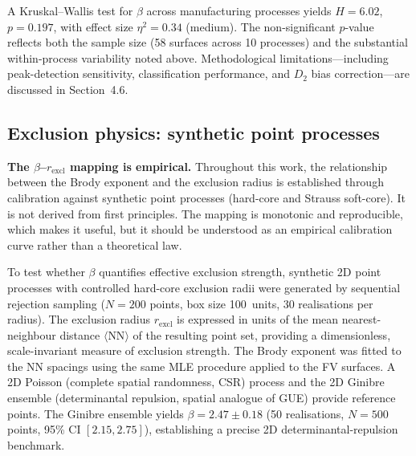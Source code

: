 \documentclass[final,3p,times,twocolumn]{elsarticle}
\theoremstyle{definition}
\begin{document}
A Kruskal--Wallis test for $\beta$ across manufacturing
processes yields $H = 6.02$, $p = 0.197$, with effect size
$\eta^2 = 0.34$ (medium). The non-significant $p$-value reflects
both the sample size (58 surfaces across 10 processes) and the
substantial within-process variability noted above.
Methodological limitations---including peak-detection sensitivity,
classification performance, and $D_2$ bias correction---are
discussed in Section~4.6.

\subsection{Exclusion physics: synthetic point processes}

\textbf{The $\beta$--$r_{\text{excl}}$ mapping is empirical.}
Throughout this work, the relationship between the Brody exponent
and the exclusion radius is established through calibration against
synthetic point processes (hard-core and Strauss soft-core). It is
not derived from first principles. The mapping is monotonic and
reproducible, which makes it useful, but it should be understood
as an empirical calibration curve rather than a theoretical law.

To test whether $\beta$ quantifies effective exclusion strength,
synthetic 2D point
processes with controlled hard-core exclusion radii were
generated by sequential rejection sampling ($N=200$ points,
box size 100~units, 30 realisations per radius). The exclusion
radius $r_{\text{excl}}$ is expressed in units of the mean
nearest-neighbour distance $\langle\text{NN}\rangle$ of the
resulting point set, providing a dimensionless, scale-invariant
measure of exclusion strength. The Brody exponent was fitted to
the NN spacings using the same MLE procedure applied to the FV
surfaces. A 2D Poisson (complete spatial randomness, CSR)
process and the 2D Ginibre ensemble (determinantal repulsion,
spatial analogue of GUE) provide reference points. The Ginibre
ensemble yields $\beta = 2.47 \pm 0.18$ (50 realisations,
$N=500$ points, 95\% CI $[2.15, 2.75]$), establishing a precise
2D determinantal-repulsion benchmark.
\end{document}
